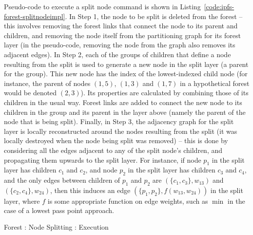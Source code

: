 Pseudo-code to execute a split node command is shown in Listing~\ref{code:ipfs-forest-splitnodeimpl}. In Step 1, the node to be split is deleted from the forest -- this involves removing the forest links that connect the node to its parent and children, and removing the node itself from the partitioning graph for its forest layer (in the pseudo-code, removing the node from the graph also removes its adjacent edges). In Step 2, each of the groups of children that define a node resulting from the split is used to generate a new node in the split layer (a parent for the group). This new node has the index of the lowest-indexed child node (for instance, the parent of nodes $(1,5)$, $(1,3)$ and $(1,7)$ in a hypothetical forest would be denoted $(2,3)$). Its properties are calculated by combining those of its children in the usual way. Forest links are added to connect the new node to its children in the group and its parent in the layer above (namely the parent of the node that is being split). Finally, in Step 3, the adjacency graph for the split layer is locally reconstructed around the nodes resulting from the split (it was locally destroyed when the node being split was removed) -- this is done by considering all the edges adjacent to any of the split node's children, and propagating them upwards to the split layer. For instance, if node $p_1$ in the split layer has children $c_1$ and $c_2$, and node $p_2$ in the split layer has children $c_3$ and $c_4$, and the only edges between children of $p_1$ and $p_2$ are $(\{c_1,c_3\}, w_{13})$ and $(\{c_2,c_4\}, w_{24})$, then this induces an edge $(\{p_1,p_2\}, f(w_{13}, w_{24}))$ in the split layer, where $f$ is some appropriate function on edge weights, such as $\min$ in the case of a lowest pass point approach.

\begin{stulisting}[t]
\caption{Forest : Node Splitting : Execution}
\label{code:ipfs-forest-splitnodeimpl}

\end{stulisting}


